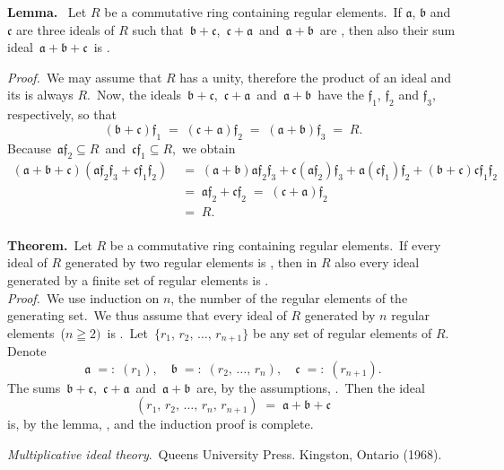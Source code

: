 \documentclass[12pt]{article}
\theoremstyle{definition}
\begin{document}
\textbf{Lemma.} \, Let $R$ be a commutative ring containing regular elements. \,If $\mathfrak{a}$, $\mathfrak{b}$ and $\mathfrak{c}$ are three ideals of $R$ such that \,$\mathfrak{b\!+\!c}$,\, $\mathfrak{c\!+\!a}$\, and\, $\mathfrak{a\!+\!b}$\, are , then also their sum ideal\, $\mathfrak{a\!+\!b\!+\!c}$\, is .

{\em Proof.} \,We may assume that $R$ has a unity, therefore the product of an ideal and its  is always $R$.\, Now, the ideals\, $\mathfrak{b+c}$,\, $\mathfrak{c+a}$\, and\, $\mathfrak{a+b}$\, have the  $\mathfrak{f_1}$, $\mathfrak{f_2}$ and $\mathfrak{f_3}$, respectively, so that
  $$\mathfrak{(b+c)f_1 \;=\; (c+a)f_2 \;=\; (a+b)f_3} \;=\; R.$$
Because\, $\mathfrak{af_2} \subseteq R$\, and\, $\mathfrak{cf_1} \subseteq R$,\, we obtain
\begin{align*} 
\mathfrak{(a+b+c)(af_2f_3+cf_1f_2)} &\;=\; \mathfrak{(a+b)af_2f_3+c(af_2)f_3+a(cf_1)f_2+(b+c)cf_1f_2}\\ 
                                   &\;=\; \mathfrak{af_2+cf_2 \;=\; (c+a)f_2}\\ 
                                   &\;=\; R.
\end{align*}\\

\textbf{Theorem.}\, Let $R$ be a commutative ring containing regular 
elements.\, If every ideal of $R$ generated by two regular elements is , then in $R$ also every ideal generated by a finite set of regular elements is .\\

{\em Proof.} \,We use induction on $n$, the number of the regular elements of the generating set.\, We thus assume that every ideal of $R$ generated by $n$ regular elements\, ($n \geqq 2)$\, is .\, Let \,$\{r_1,\,r_2,\,\ldots,\,r_{n+1}\}$ be any set of regular elements of $R$.\, Denote 
 $$\mathfrak{a} \;=:\; (r_1),\quad \mathfrak{b} \;=:\; (r_2,\,\ldots,\,r_n),
                         \quad \mathfrak{c} \;=:\; (r_{n+1}).$$
The sums \,$\mathfrak{b+c}$, \,$\mathfrak{c+a}$\, and\, $\mathfrak{a+b}$\, are, by the assumptions, .\, Then the ideal
    $$(r_1,\,r_2,\,\ldots,\,r_n,\,r_{n+1}) \;=\; \mathfrak{a+b+c}$$
is, by the lemma, , and the induction 
proof is complete.

\begin{thebibliography}{9}
 {\em Multiplicative ideal theory}. \,Queens University Press. Kingston, Ontario (1968).
\end{thebibliography}
\end{document}
